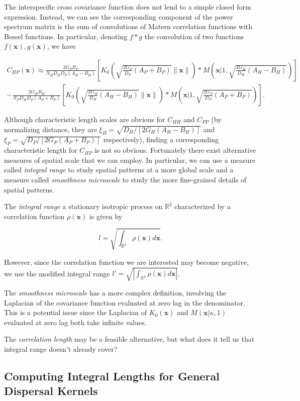 \documentclass{article}
\begin{document}
The interspecific cross covariance function does not lend to a simple
closed form expression. Instead, we can see the corresponding component
of the power spectrum matrix is the sum of convolutions of Matern
correlation functions with Bessel functions. In particular, denoting
\(f*g\) the convolution of two functions \(f(\pmb x),g(\pmb x)\), we
have

\begin{multline}
  C_{HP}(\pmb x) \approx \frac{2G_PB_P}{N_HD_HD_P(A_H-B_H)}\left[K_0\left(\sqrt{\frac{2G_P}{D_P}(A_P+B_P)}\|\pmb x\|\right) * M\left(\pmb x\Big|1,\sqrt{\frac{2G_H}{D_H}(A_H-B_H)}\right)\right] \\ - \frac{2G_HB_H}{N_PD_HD_P(A_P+B_P)}\left[K_0\left(\sqrt{\frac{2G_H}{D_H}(A_H-B_H)}\|\pmb x\|\right)*M\left(\pmb x\Big|1,\sqrt{\frac{2G_P}{D_P}(A_P+B_P)}\right)\right].
\end{multline}

Although characteristic length scales are obvious for \(C_{HH}\) and
\(C_{PP}\) (by normalizing distance, they are
\(\xi_H=\sqrt{D_H/[2G_H(A_H-B_H)]}\) and
\(\xi_P=\sqrt{D_P/[2G_P(A_P+B_P)]}\) respectively), finding a
corresponding characteristic length for \(C_{HP}\) is not so obvious.
Fortunately there exist alternative measures of spatial scale that we
can employ. In particular, we can use a measure called \emph{integral
range} to study spatial patterns at a more global scale and a measure
called \emph{smoothness microscale} to study the more fine-grained
details of spatial patterns.

The \emph{integral range} a stationary isotropic process on
\(\mathbb R^2\) characterized by a correlation function \(\rho(\pmb x)\)
is given by

\[l=\sqrt{\int_{\mathbb R^2}\rho(\pmb x)d\pmb x}.\]

However, since the correlation function we are interested may become
negative, we use the modified integral range
\(l'=\sqrt{\left|\int_{\mathbb R^2}\rho(\pmb x)d\pmb x\right|}\).

The \emph{smoothness microscale} has a more complex definition,
involving the Laplacian of the covariance function evaluated at zero lag
in the denominator. This is a potential issue since the Laplacian of
\(K_0(\pmb x)\) and \(M(\pmb x|\kappa,1)\) evaluated at zero lag both
take infinite values.

The \emph{correlation length} may be a feasible alternative, but what
does it tell us that integral range doesn't already cover?

\hypertarget{computing-integral-lengths-for-general-dispersal-kernels}{%
\subsection{Computing Integral Lengths for General Dispersal
Kernels}\label{computing-integral-lengths-for-general-dispersal-kernels}}
\end{document}

